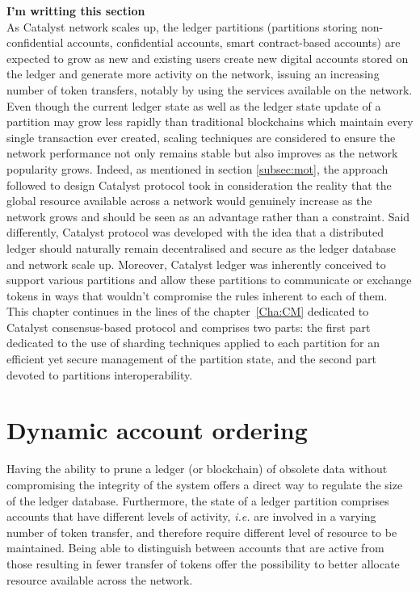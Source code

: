 \textbf{I'm writting this section}\\


As Catalyst network scales up, the ledger partitions (partitions storing non-confidential accounts, confidential accounts, smart contract-based accounts) are expected to grow as new and existing users create new digital accounts stored on the ledger and generate more activity on the network, issuing an increasing number of token transfers, notably by using the services available on the network. Even though the current ledger state as well as the ledger state update of a partition may grow less rapidly than traditional blockchains which maintain every single transaction ever created, scaling techniques are considered to ensure the network performance not only remains stable but also improves as the network popularity grows. Indeed, as mentioned in section \ref{subsec:mot}, the approach followed to design Catalyst protocol took in consideration the reality that the global resource available across a network would genuinely increase as the network grows and should be seen as an advantage rather than a constraint. Said differently, Catalyst protocol was developed with the idea that a distributed ledger should naturally remain decentralised and secure as the ledger database and network scale up. Moreover, Catalyst ledger was inherently conceived to support various partitions and allow these partitions to communicate or exchange tokens in ways that wouldn't compromise the rules inherent to each of them. \\

This chapter continues in the lines of the chapter~\ref{Cha:CM} dedicated to Catalyst consensus-based protocol and comprises two parts: the first part dedicated to the use of sharding techniques applied to each partition for an efficient yet secure management of the partition state, and the second part devoted to partitions interoperability. %

\section{Dynamic account ordering}
Having the ability to prune a ledger (or blockchain) of obsolete data without compromising the integrity of the system offers a direct way to regulate the size of the ledger database. Furthermore, the state of a ledger partition comprises accounts that have different levels of activity, \textit{i.e.} are involved in a varying number of token transfer, and therefore require different level of resource to be maintained. Being able to distinguish between accounts that are active from those resulting in fewer transfer of tokens offer the possibility to better allocate resource available across the network. \\

